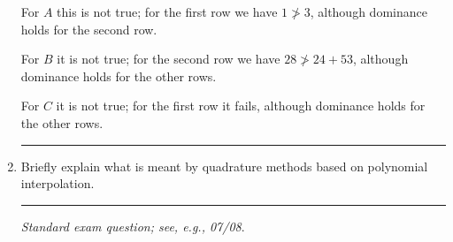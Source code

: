 \documentclass[10pt]{article}
\begin{document}
\begin{enumerate}
  For $A$ this is not true; for the first row we have $1 \ngtr 3$,
  although dominance holds for the second row.

  For $B$ it is not true; for the second row we have $28 \ngtr 24 +
  53$, although dominance holds for the other rows.

  For $C$ it is not true; for the first row it fails, although
  dominance holds for the other rows.
  \begin{center}
    \rule{0.9\textwidth}{.1pt}
  \end{center}
\item Briefly explain what is meant by quadrature methods based on
  polynomial interpolation.
  \begin{center}
    \rule{0.9\textwidth}{.1pt}
  \end{center}
  {\it Standard exam question; see, e.g., 07/08}.


\end{enumerate}
\end{document}

